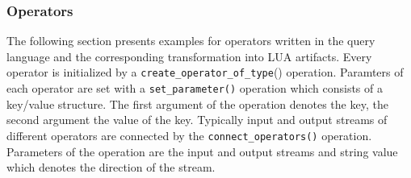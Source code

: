 \subsubsection{Operators}
The following section presents examples for operators written in the query 
language and the corresponding  transformation into LUA artifacts. Every 
operator is initialized by a \texttt{create\_operator\_of\_type}() operation. 
Paramters of each operator are set with a \texttt{set\_param\-eter()} operation 
which consists of a key/value structure. The first argument of the operation
denotes the key, the second argument the value of the key. Typically input and
output streams of different operators are connected by the 
\texttt{connect\_operators()} operation. Parameters of the operation are the 
input and output streams and string value which denotes the direction of the 
stream. 

